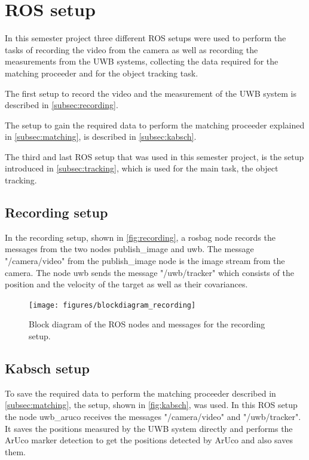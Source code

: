 \section{ROS setup}
In this semester project three different ROS setups were used to perform the tasks of recording the video from the camera as well as recording the measurements from the UWB systems, collecting the data required for the matching proceeder and for the object tracking task.

The first setup to record the video and the measurement of the UWB system is described in \autoref{subsec:recording}.

The setup to gain the required data to perform the matching proceeder explained in \autoref{subsec:matching}, is described in \autoref{subsec:kabsch}.

The third and last ROS setup that was used in this semester project, is the setup introduced in \autoref{subsec:tracking}, which is used for the main task, the object tracking.

\subsection{Recording setup}\label{subsec:recording}
In the recording setup, shown in \autoref{fig:recording}, a rosbag node records the messages from the two nodes publish\_image and uwb. The message "/camera/video" from the publish\_image node is the image stream from the camera. The node uwb sends the message "/uwb/tracker" which consists of the position and the velocity of the target as well as their covariances.

\begin{figure}[h]\centering
	\texttt{[image: figures/blockdiagram\_recording]}
	\caption{Block diagram of the ROS nodes and messages for the recording setup.}\label{fig:recording}
\end{figure}

\subsection{Kabsch setup}\label{subsec:kabsch}
To save the required data to perform the matching proceeder described in \autoref{subsec:matching}, the setup, shown in \autoref{fig:kabsch}, was used. In this ROS setup the node uwb\_aruco receives the messages "/camera/video" and "/uwb/tracker". It saves the positions measured by the UWB system directly and performs the ArUco marker detection to get the positions detected by ArUco and also saves them.

